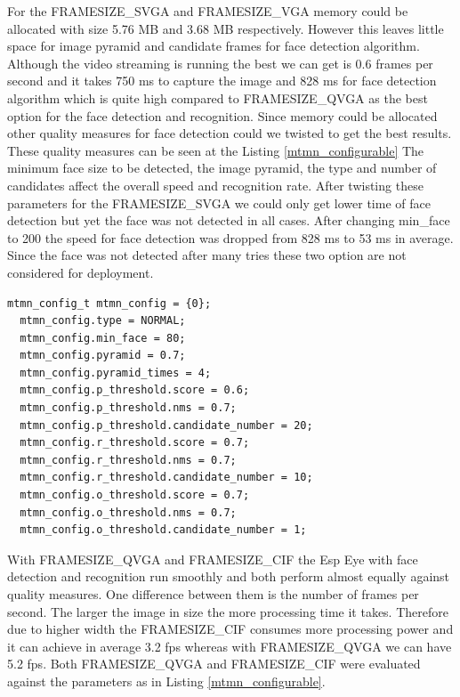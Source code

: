 For the {\selectfont FRAMESIZE\_SVGA} and {\selectfont FRAMESIZE\_VGA}  memory could be allocated with size 5.76 MB and 3.68 MB respectively. However this leaves little space for image pyramid and candidate frames for face detection algorithm. Although the video streaming is running the best we can get is 0.6 frames per second and it takes 750 ms to capture the image  and 828 ms for face detection algorithm which is quite high compared to {\selectfont FRAMESIZE\_QVGA} as the best option for the face detection and recognition. Since memory could be allocated other quality measures for face detection could we twisted to get the best results. These quality measures can be seen at the Listing \ref{mtmn_configurable}
The minimum face size to be detected, the image pyramid, the type and number of candidates affect the overall speed and recognition rate. 
After twisting these parameters for the {\selectfont FRAMESIZE\_SVGA} we could only get lower time of face detection but yet the face was not detected in all cases. After changing {\selectfont min\_face} to 200 the speed for face detection was dropped from 828 ms to 53 ms in average. Since the face was not detected after many tries these two option are not considered for deployment. 



\begin{lstlisting}[caption={Face detection configurable parameters},label=mtmn_configurable, captionpos=b]
 mtmn_config_t mtmn_config = {0};
  mtmn_config.type = NORMAL;
  mtmn_config.min_face = 80;
  mtmn_config.pyramid = 0.7; 
  mtmn_config.pyramid_times = 4;
  mtmn_config.p_threshold.score = 0.6;
  mtmn_config.p_threshold.nms = 0.7;
  mtmn_config.p_threshold.candidate_number = 20; 
  mtmn_config.r_threshold.score = 0.7;
  mtmn_config.r_threshold.nms = 0.7;
  mtmn_config.r_threshold.candidate_number = 10;
  mtmn_config.o_threshold.score = 0.7;
  mtmn_config.o_threshold.nms = 0.7;
  mtmn_config.o_threshold.candidate_number = 1;

\end{lstlisting}

With {\selectfont FRAMESIZE\_QVGA} and {\selectfont FRAMESIZE\_CIF} the Esp Eye with face detection and recognition run smoothly and both perform almost equally against quality measures. One difference between them is the number of frames per second. The larger the image in size the more processing time it takes. Therefore due to higher width the {\selectfont FRAMESIZE\_CIF} consumes more processing power and it can achieve in average 3.2 fps whereas with {\selectfont FRAMESIZE\_QVGA} we can have 5.2 fps. 
Both {\selectfont FRAMESIZE\_QVGA} and {\selectfont FRAMESIZE\_CIF} were evaluated against the parameters as in Listing \ref{mtmn_configurable}.

